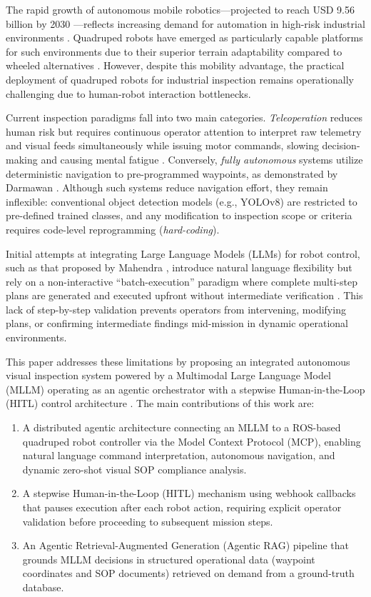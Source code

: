 \documentclass[conference]{IEEEtran}
\begin{document}
The rapid growth of autonomous mobile robotics—projected to reach USD 9.56 billion by 2030 \cite{GrandView2024}—reflects increasing demand for automation in high-risk industrial environments \cite{LookingGlass2024}. Quadruped robots have emerged as particularly capable platforms for such environments due to their superior terrain adaptability compared to wheeled alternatives \cite{fan2024review}. However, despite this mobility advantage, the practical deployment of quadruped robots for industrial inspection remains operationally challenging due to human-robot interaction bottlenecks.

Current inspection paradigms fall into two main categories. \textit{Teleoperation} reduces human risk but requires continuous operator attention to interpret raw telemetry and visual feeds simultaneously while issuing motor commands, slowing decision-making and causing mental fatigue \cite{rea2022still}. Conversely, \textit{fully autonomous} systems utilize deterministic navigation to pre-programmed waypoints, as demonstrated by Darmawan \cite{Darmawan2025}. Although such systems reduce navigation effort, they remain inflexible: conventional object detection models (e.g., YOLOv8) are restricted to pre-defined trained classes, and any modification to inspection scope or criteria requires code-level reprogramming (\textit{hard-coding}).

Initial attempts at integrating Large Language Models (LLMs) for robot control, such as that proposed by Mahendra \cite{Mahendra2024}, introduce natural language flexibility but rely on a non-interactive ``batch-execution'' paradigm where complete multi-step plans are generated and executed upfront without intermediate verification \cite{huang2022language}. This lack of step-by-step validation prevents operators from intervening, modifying plans, or confirming intermediate findings mid-mission in dynamic operational environments.

This paper addresses these limitations by proposing an integrated autonomous visual inspection system powered by a Multimodal Large Language Model (MLLM) operating as an agentic orchestrator with a stepwise Human-in-the-Loop (HITL) control architecture \cite{ravichandar2020recent}. The main contributions of this work are:
\begin{enumerate}
    \item A distributed agentic architecture connecting an MLLM to a ROS-based quadruped robot controller via the Model Context Protocol (MCP), enabling natural language command interpretation, autonomous navigation, and dynamic zero-shot visual SOP compliance analysis.
    \item A stepwise Human-in-the-Loop (HITL) mechanism using webhook callbacks that pauses execution after each robot action, requiring explicit operator validation before proceeding to subsequent mission steps.
    \item An Agentic Retrieval-Augmented Generation (Agentic RAG) pipeline that grounds MLLM decisions in structured operational data (waypoint coordinates and SOP documents) retrieved on demand from a ground-truth database.
\end{enumerate}
\end{document}
